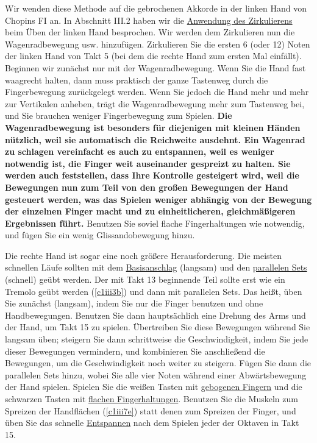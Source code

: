 Wir wenden diese Methode auf die gebrochenen Akkorde in der linken Hand von Chopins FI an.
In Abschnitt III.2 haben wir die \hyperref[c1iii2]{Anwendung des Zirkulierens} beim Üben der linken Hand besprochen.
Wir werden dem Zirkulieren nun die Wagenradbewegung usw. hinzufügen.
Zirkulieren Sie die ersten 6 (oder 12) Noten der linken Hand von Takt 5 (bei dem die rechte Hand zum ersten Mal einfällt).
Beginnen wir zunächst nur mit der Wagenradbewegung.
Wenn Sie die Hand fast waagrecht halten, dann muss praktisch der ganze Tastenweg durch die Fingerbewegung zurückgelegt werden.
Wenn Sie jedoch die Hand mehr und mehr zur Vertikalen anheben, trägt die Wagenradbewegung mehr zum Tastenweg bei, und Sie brauchen weniger Fingerbewegung zum Spielen.
\textbf{Die Wagenradbewegung ist besonders für diejenigen mit kleinen Händen nützlich, weil sie automatisch die Reichweite ausdehnt.
Ein Wagenrad zu schlagen vereinfacht es auch zu entspannen, weil es weniger notwendig ist, die Finger weit auseinander gespreizt zu halten.
Sie werden auch feststellen, dass Ihre Kontrolle gesteigert wird, weil die Bewegungen nun zum Teil von den großen Bewegungen der Hand gesteuert werden, was das Spielen weniger abhängig von der Bewegung der einzelnen Finger macht und zu einheitlicheren, gleichmäßigeren Ergebnissen führt.}
Benutzen Sie soviel flache Fingerhaltungen wie notwendig, und fügen Sie ein wenig Glissandobewegung hinzu.  


Die rechte Hand ist sogar eine noch größere Herausforderung.
Die meisten schnellen Läufe sollten mit dem \hyperref[c1iii1a1]{Basisanschlag} (langsam) und den \hyperref[c1ii11]{parallelen Sets} (schnell) geübt werden.
Der mit Takt 13 beginnende Teil sollte erst wie ein Tremolo geübt werden (\hyperref[c1iii3b]{\autoref{c1iii3b}}) und dann mit parallelen Sets.
Das heißt, üben Sie zunächst (langsam), indem Sie nur die Finger benutzen und ohne Handbewegungen.
Benutzen Sie dann hauptsächlich eine Drehung des Arms und der Hand, um Takt 15 zu spielen.
Übertreiben Sie diese Bewegungen während Sie langsam üben; steigern Sie dann schrittweise die Geschwindigkeit, indem Sie jede dieser Bewegungen vermindern, und kombinieren Sie anschließend die Bewegungen, um die Geschwindigkeit noch weiter zu steigern.
Fügen Sie dann die parallelen Sets hinzu, wobei Sie alle vier Noten während einer Abwärtsbewegung der Hand spielen.
Spielen Sie die weißen Tasten mit \hyperref[c1ii2]{gebogenen Fingern} und die schwarzen Tasten mit \hyperref[c1iii4b]{flachen Fingerhaltungen}.
Benutzen Sie die Muskeln zum Spreizen der Handflächen (\hyperref[c1iii7e]{\autoref{c1iii7e}}) statt denen zum Spreizen der Finger, und üben Sie das schnelle \hyperref[c1ii14]{Entspannen} nach dem Spielen jeder der Oktaven in Takt 15.

